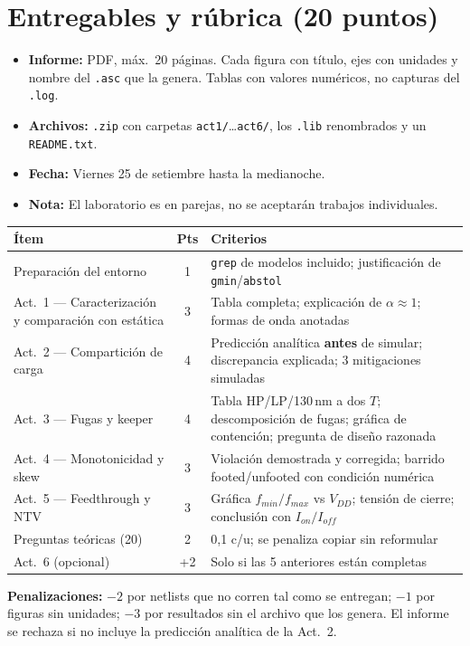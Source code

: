 \documentclass[11pt,a4paper]{article}
\begin{document}
\section{Entregables y rúbrica (20 puntos)}
\begin{itemize}
\item \textbf{Informe:} PDF, máx.\ 20 páginas. Cada figura con título, ejes con unidades y nombre del \texttt{.asc} que la genera. Tablas con valores numéricos, no capturas del \texttt{.log}.
\item \textbf{Archivos:} \texttt{.zip} con carpetas \texttt{act1/}\dots\texttt{act6/}, los \texttt{.lib} renombrados y un \texttt{README.txt}.
\item \textbf{Fecha:} Viernes 25 de setiembre hasta la medianoche.
\item \textbf{Nota:} El laboratorio es en parejas, no se aceptarán trabajos individuales.
\end{itemize}
\begin{center}\small
\begin{tabular}{@{}p{6.2cm}cp{7.2cm}@{}}
\toprule
\textbf{Ítem} & \textbf{Pts} & \textbf{Criterios}\\
\midrule
Preparación del entorno & 1 & \texttt{grep} de modelos incluido; justificación de \texttt{gmin}/\texttt{abstol}\\
Act.\ 1 — Caracterización y comparación con estática & 3 & Tabla completa; explicación de $\alpha\approx1$; formas de onda anotadas\\
Act.\ 2 — Compartición de carga & 4 & Predicción analítica \textbf{antes} de simular; discrepancia explicada; 3 mitigaciones simuladas\\
Act.\ 3 — Fugas y keeper & 4 & Tabla HP/LP/130\,nm a dos $T$; descomposición de fugas; gráfica de contención; pregunta de diseño razonada\\
Act.\ 4 — Monotonicidad y skew & 3 & Violación demostrada y corregida; barrido footed/unfooted con condición numérica\\
Act.\ 5 — Feedthrough y NTV & 3 & Gráfica $f_{min}/f_{max}$ vs $V_{DD}$; tensión de cierre; conclusión con $I_{on}/I_{off}$\\
Preguntas teóricas (20) & 2 & 0{,}1 c/u; se penaliza copiar sin reformular\\
Act.\ 6 (opcional) & +2 & Solo si las 5 anteriores están completas\\
\bottomrule
\end{tabular}
\end{center}
\textbf{Penalizaciones:} $-2$ por netlists que no corren tal como se entregan; $-1$ por figuras sin unidades; $-3$ por resultados sin el archivo que los genera. El informe se rechaza si no incluye la predicción analítica de la Act.~2.
\end{document}

